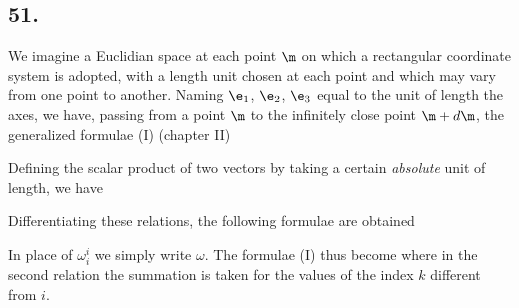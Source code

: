 \subsection*{51.}

We imagine a Euclidian space at each point $\m$ on which a rectangular coordinate system is adopted, with a length unit chosen at each point and which may vary from one point to another. Naming $\e_1$, $\e_2$, $\e_3$ equal to the unit of length  the axes, we have, passing from a point $\m$ to the infinitely close point $\m+d\m$, the generalized formulae (I) (chapter II)

Defining the scalar product of two vectors by taking a certain \textit{absolute} unit of length, we have

Differentiating these relations, the following formulae are obtained

In place of $\omega_i^i$ we simply write $\omega$. The formulae (I) thus become
where in the second relation the summation is taken for the values of the index $k$ different from $i$.